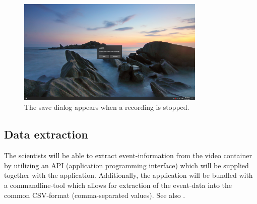 \begin{figure}[H]
  \includegraphics[width=0.8\textwidth, trim={20cm 10cm 20cm 10cm}, clip]{resources/ui_save_dialogue.png}
  \centering
  \caption{The save dialog appears when a recording is stopped.}
  \label{fig:sm_ui_saving}
\end{figure}

\subsection{Data extraction}
\label{sec:sm_extraction}
The \glspl{scientist} will be able to extract \gls{event}-information from the video container by utilizing an API (application programming interface) which will be supplied together with the application. Additionally, the application will be bundled with a commandline-tool which allows for extraction of the \gls{event}-data into the common CSV-format (comma-separated values). See also .